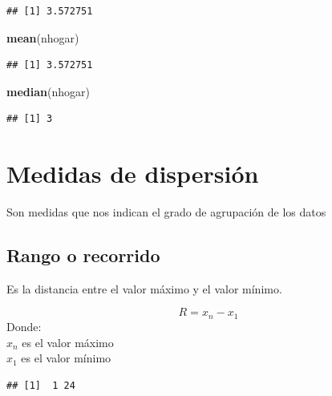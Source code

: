 \documentclass[spanish,]{book}
\newenvironment{Shaded}{\begin{snugshade}}{\end{snugshade}}
\newcommand{\KeywordTok}[1]{\textcolor[rgb]{0.13,0.29,0.53}{\textbf{#1}}}
\newcommand{\StringTok}[1]{\textcolor[rgb]{0.31,0.60,0.02}{#1}}
\newcommand{\OperatorTok}[1]{\textcolor[rgb]{0.81,0.36,0.00}{\textbf{#1}}}
\newcommand{\NormalTok}[1]{#1}
\begin{document}
\begin{verbatim}
## [1] 3.572751
\end{verbatim}

\begin{Shaded}
\begin{Highlighting}[]
\KeywordTok{mean}\NormalTok{(nhogar)}
\end{Highlighting}
\end{Shaded}

\begin{verbatim}
## [1] 3.572751
\end{verbatim}

\begin{Shaded}
\begin{Highlighting}[]
\KeywordTok{median}\NormalTok{(nhogar)}
\end{Highlighting}
\end{Shaded}

\begin{verbatim}
## [1] 3
\end{verbatim}

\section{Medidas de dispersión}\label{medidas-de-dispersion}

Son medidas que nos indican el grado de agrupación de los datos

\subsection{Rango o recorrido}\label{rango-o-recorrido}

Es la distancia entre el valor máximo y el valor mínimo.

\[
R = x_{n} - x_{1}
\] Donde:\\
\(x_n\) es el valor máximo\\
\(x_1\) es el valor mínimo

\begin{Shaded}
\end{Shaded}

\begin{verbatim}
## [1]  1 24
\end{verbatim}
\end{document}
